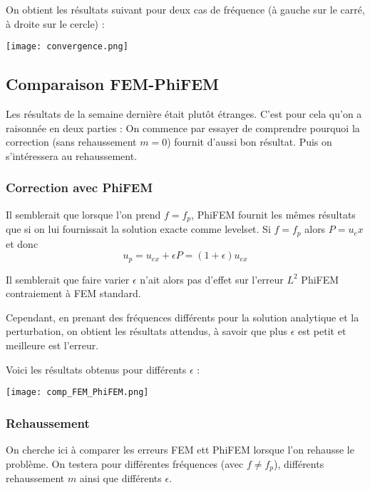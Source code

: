 On obtient les résultats suivant pour deux cas de fréquence (à gauche sur le carré, à droite sur le cercle) :

\begin{minipage}{\linewidth}
	\centering
	\texttt{[image: convergence.png]}
\end{minipage}

\subsection{Comparaison FEM-PhiFEM}

Les résultats de la semaine dernière était plutôt étranges. C'est pour cela qu'on a raisonnée en deux parties : On commence par essayer de comprendre pourquoi la correction (sans rehaussement $m=0$) fournit d'aussi bon résultat. Puis on s'intéressera au rehaussement.

\subsubsection*{Correction avec PhiFEM}

Il semblerait que lorsque l'on prend $f=f_p$, PhiFEM fournit les mêmes résultats que si on lui fournissait la solution exacte comme levelset. Si $f=f_p$ alors $P=u_ex$ et donc 
$$u_p=u_{ex}+\epsilon P=(1+\epsilon)u_{ex}$$

Il semblerait que faire varier $\epsilon$ n'ait alors pas d'effet sur l'erreur $L^2$ PhiFEM contraiement à FEM standard.

Cependant, en prenant des fréquences différents pour la solution analytique et la perturbation, on obtient les résultats attendus, à savoir que plus $\epsilon$ est petit et meilleure est l'erreur. 

Voici les résultats obtenus pour différents $\epsilon$ :

\begin{minipage}{\linewidth}
	\centering
	\texttt{[image: comp\_FEM\_PhiFEM.png]}
\end{minipage}

\subsubsection*{Rehaussement}

On cherche ici à comparer les erreurs FEM ett PhiFEM lorsque l'on rehausse le problème. On testera pour différentes fréquences (avec $f\ne f_p$), différents rehaussement $m$ ainsi que différents $\epsilon$.

